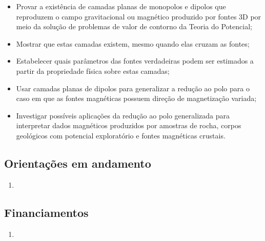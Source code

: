 \begin{itemize}
	\item[\parbox{0.03\textwidth}{\vspace{-0.1\baselineskip}\faSquareRoot*}]
	Provar a existência de camadas planas de monopolos e dipolos que reproduzem
	o campo gravitacional ou magnético produzido por fontes 3D por meio da solução
	de problemas de valor de contorno da Teoria do Potencial;
	\item[\parbox{0.03\textwidth}{\vspace{-0.1\baselineskip}\faSquareRoot*}]
	Mostrar que estas camadas existem, mesmo quando elas cruzam as fontes;
	\item[\parbox{0.03\textwidth}{\vspace{-0.1\baselineskip}\faSquareRoot*}]
	Estabelecer quais parâmetros das fontes verdadeiras podem ser estimados a
	partir da propriedade física sobre estas camadas;
	\item[\parbox{0.03\textwidth}{\vspace{-0.1\baselineskip}\faSquareRoot*}]
	Usar camadas planas de dipolos para generalizar a redução ao polo para o caso 
	em que as fontes magnéticas possuem direção de magnetização variada;
	\item[\parbox{0.03\textwidth}{\vspace{-0.1\baselineskip}\faSquareRoot*}]
	Investigar possíveis aplicações da redução ao polo generalizada para 
	interpretar dados magnéticos produzidos por amostras de rocha, corpos geológicos com 
	potencial exploratório e fontes magnéticas crustais.
\end{itemize}

\subsection*{Orientações em andamento}

\begin{enumerate}
	\item{}	
\end{enumerate}

\subsection*{Financiamentos}

\begin{enumerate}
	
	\item{}
	
\end{enumerate}

